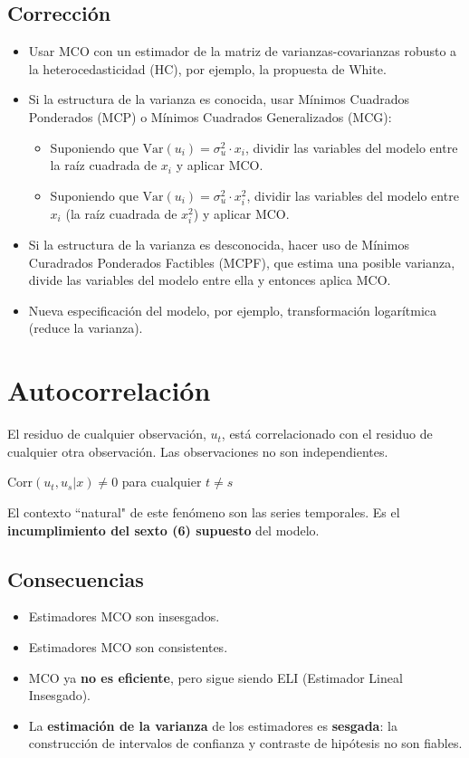 \documentclass[10pt, a4paper, landscape]{extarticle}
\newcommand{\Var}{\mathrm{Var}}
\newcommand{\Corr}{\mathrm{Corr}}
\begin{document}
\begin{multicols}{3}
	\subsection*{Corrección}
		\begin{itemize}[leftmargin=*]
			\item Usar MCO con un estimador de la matriz de varianzas-covarianzas robusto a la heterocedasticidad (HC), por ejemplo, la propuesta de White.
			\item Si la estructura de la varianza es conocida, usar Mínimos Cuadrados Ponderados (MCP) o Mínimos Cuadrados Generalizados (MCG):
			\begin{itemize}[leftmargin=*]
				\item Suponiendo que $\Var(u_i) = \sigma^2_u \cdot x_i$, dividir las variables del modelo entre la raíz cuadrada de $x_i$ y aplicar MCO.
				\item Suponiendo que $\Var(u_i) = \sigma^2_u \cdot x_i^2$, dividir las variables del modelo entre $x_i$ (la raíz cuadrada de $x_i^2$) y aplicar MCO.
			\end{itemize}
			\item Si la estructura de la varianza es desconocida, hacer uso de Mínimos Curadrados Ponderados Factibles (MCPF), que estima una posible varianza, divide las variables del modelo entre ella y entonces aplica MCO.
			\item Nueva especificación del modelo, por ejemplo, transformación logarítmica (reduce la varianza).
	\end{itemize}
\columnbreak
\section*{Autocorrelación}
	El residuo de cualquier observación, $u_t$, está correlacionado con el residuo de cualquier otra observación. Las observaciones no son independientes.
	\begin{center}
		$\Corr(u_t, u_s | x) \neq 0$ para cualquier $t \neq s$
	\end{center}
	El contexto ``natural" de este fenómeno son las series temporales. Es el \textbf{incumplimiento del sexto (6) supuesto} del modelo.
	\subsection*{Consecuencias}
		\begin{itemize}[leftmargin=*]
			\item Estimadores MCO son insesgados.
			\item Estimadores MCO son consistentes.
			\item MCO ya \textbf{no es eficiente}, pero sigue siendo ELI (Estimador Lineal Insesgado).
			\item La \textbf{estimación de la varianza} de los estimadores es \textbf{sesgada}: la construcción de intervalos de confianza y contraste de hipótesis no son fiables.
		\end{itemize}

\end{multicols}
\end{document}
